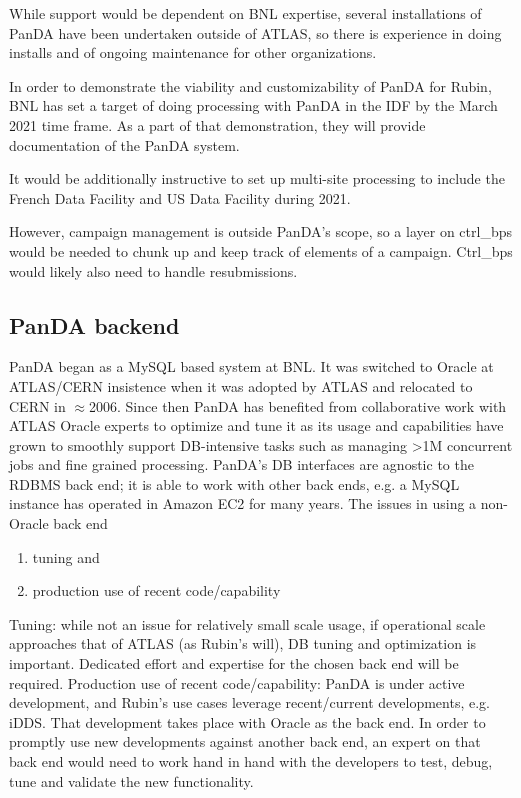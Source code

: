 While support would be dependent on BNL expertise, several
installations of PanDA have been undertaken outside of ATLAS, so there
is experience in doing installs and of ongoing maintenance for other
organizations.

In order to demonstrate the viability and customizability of PanDA for
Rubin, BNL has set a target of doing processing with PanDA in the IDF
by the March 2021 time frame. As a part of that demonstration, they
will provide documentation of the PanDA system.

It would be additionally instructive to set up multi-site processing
to include the French Data Facility and US Data Facility during 2021.

However, campaign management is outside PanDA’s scope, so a layer on ctrl\_bps would be needed to chunk up and keep track of elements of a campaign. Ctrl\_bps would likely also need to handle resubmissions.

\subsection{PanDA backend}
PanDA began as a MySQL based system at BNL. It was switched to Oracle at ATLAS/CERN insistence when it was adopted by ATLAS and relocated to CERN in $\approx$2006. Since then PanDA has benefited from collaborative work with ATLAS Oracle experts to optimize and tune it as its usage and capabilities have grown to smoothly support DB-intensive tasks such as managing >1M concurrent jobs and fine grained processing.
PanDA’s DB interfaces are agnostic to the RDBMS back end; it is able to work with other back ends, e.g. a MySQL instance has operated in Amazon EC2 for many years.
The issues in using a non-Oracle back end
\begin{enumerate}
	\item tuning and
	\item production use of recent code/capability
\end{enumerate}
Tuning: while not an issue for relatively small scale usage, if operational scale approaches that of ATLAS (as Rubin’s will), DB tuning and optimization is important. Dedicated effort and expertise for the chosen back end will be required.
Production use of recent code/capability: PanDA is under active development, and Rubin’s use cases leverage recent/current developments, e.g. iDDS. That development takes place with Oracle as the back end. In order to promptly use new developments against another back end, an expert on that back end would need to work hand in hand with the developers to test, debug, tune and validate the new functionality.

